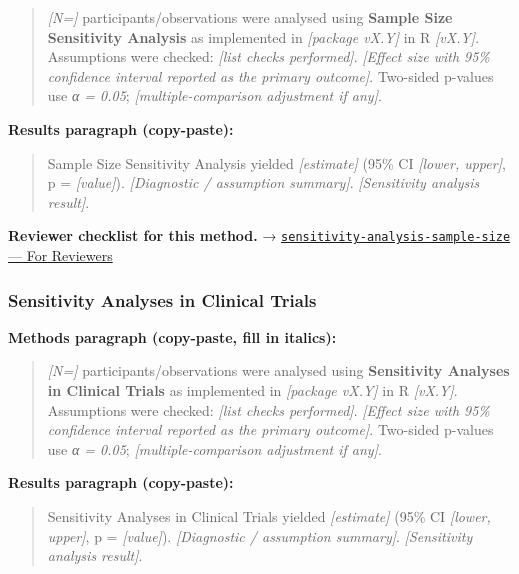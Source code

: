 \documentclass[
]{article}
\begin{document}
\begin{quote}
\emph{{[}N={]}} participants/observations were analysed using
\textbf{Sample Size Sensitivity Analysis} as implemented in
\emph{{[}package vX.Y{]}} in R \emph{{[}vX.Y{]}}. Assumptions were
checked: \emph{{[}list checks performed{]}}. \emph{{[}Effect size with
95\% confidence interval reported as the primary outcome{]}}. Two-sided
p-values use \emph{α = 0.05}; \emph{{[}multiple-comparison adjustment if
any{]}}.
\end{quote}

\textbf{Results paragraph (copy-paste):}

\begin{quote}
Sample Size Sensitivity Analysis yielded \emph{{[}estimate{]}} (95\% CI
\emph{{[}lower, upper{]}}, p = \emph{{[}value{]}}). \emph{{[}Diagnostic
/ assumption summary{]}}. \emph{{[}Sensitivity analysis result{]}}.
\end{quote}

\textbf{Reviewer checklist for this method.} →
\href{../chapters/05-power/sensitivity-analysis-sample-size.Rmd\#for-reviewers}{\texttt{sensitivity-analysis-sample-size}
--- For Reviewers}

\subsubsection{Sensitivity Analyses in Clinical
Trials}\label{sensitivity-analyses-in-clinical-trials}

\textbf{Methods paragraph (copy-paste, fill in italics):}

\begin{quote}
\emph{{[}N={]}} participants/observations were analysed using
\textbf{Sensitivity Analyses in Clinical Trials} as implemented in
\emph{{[}package vX.Y{]}} in R \emph{{[}vX.Y{]}}. Assumptions were
checked: \emph{{[}list checks performed{]}}. \emph{{[}Effect size with
95\% confidence interval reported as the primary outcome{]}}. Two-sided
p-values use \emph{α = 0.05}; \emph{{[}multiple-comparison adjustment if
any{]}}.
\end{quote}

\textbf{Results paragraph (copy-paste):}

\begin{quote}
Sensitivity Analyses in Clinical Trials yielded \emph{{[}estimate{]}}
(95\% CI \emph{{[}lower, upper{]}}, p = \emph{{[}value{]}}).
\emph{{[}Diagnostic / assumption summary{]}}. \emph{{[}Sensitivity
analysis result{]}}.
\end{quote}
\end{document}
